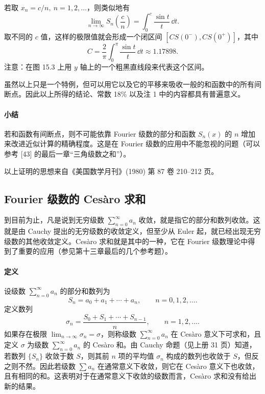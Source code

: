 \begin{xremark}
若取 $x_n=c/n,\ n=1,2,\ldots$，则类似地有
\[
  \lim_{n\to\infty}S_n\left(\frac cn\right)=\int_0^c\frac{\sin t}{t}\,\dd t.
\]
取不同的 $c$ 值，这样的极限值就会形成一个闭区间 $[CS(0^-),CS(0^+)]$，其中
\[
  C=\frac2\pi\int_0^{\pi}\frac{\sin t}{t}\,\dd t\approx1.17898.
\]
注意：在图 15.3 上用 $y$ 轴上的一个粗黑直线段来代表这个区间。
\end{xremark}

\begin{xremark}
虽然以上只是一个特例，但可以用它以及它的平移来吸收一般的和函数中的所有间断点。因此以上所得的结论、常数 18\% 以及注 1 中的内容都具有普遍意义。
\end{xremark}

\paragraph{小结}
若和函数有间断点，则不可能依靠 Fourier 级数的部分和函数 $S_n(x)$ 的 $n$ 增加来改进近似计算的精确程度。这是在 Fourier 级数的应用中不能忽视的问题（可以参考 [43] 的最后一章“三角级数之和”）。

\begin{xremark}
以上证明的思想来自《美国数学月刊》(1980) 第 87 卷 210--212 页。
\end{xremark}

\subsection{Fourier 级数的 Cesàro 求和}

到目前为止，凡是说到无穷级数 $\sum_{n=0}^{\infty}a_n$ 收敛，就是指它的部分和数列收敛。这就是由 Cauchy 提出的无穷级数的收敛定义，但至少从 Euler 起，就已经出现无穷级数的其他收敛定义。Cesàro 求和就是其中的一种，它在 Fourier 级数理论中得到了重要的应用（参见第十三章最后的几个参考题）。

\paragraph{定义}
设级数 $\sum_{n=0}^{\infty}a_n$ 的部分和数列为
\[
  S_n=a_0+a_1+\cdots+a_n,\qquad n=0,1,2,\ldots.
\]
定义数列
\[
  \sigma_n=\frac{S_0+S_1+\cdots+S_{n-1}}{n},\qquad n=1,2,\ldots.
\]
如果存在极限 $\lim_{n\to\infty}\sigma_n=\sigma$，则称级数 $\sum_{n=0}^{\infty}a_n$ 在 Cesàro 意义下可求和，且定义 $\sigma$ 为级数 $\sum_{n=0}^{\infty}a_n$ 的 Cesàro 和。由 Cauchy 命题（见上册 31 页）知道，若数列 $\{S_n\}$ 收敛于数 $S$，则其前 $n$ 项的平均值 $\sigma_n$ 构成的数列也收敛于 $S$，但反之则不然。因此若级数 $\sum a_n$ 在通常意义下收敛，则它在 Cesàro 意义下也收敛，且有相同的和。这表明对于在通常意义下收敛的级数而言，Cesàro 求和没有给出新的结果。

